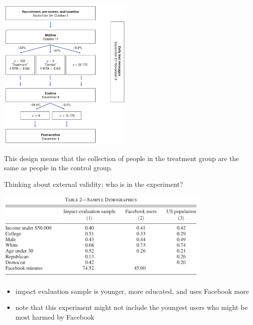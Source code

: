 \documentclass[aspectratio=169]{beamer}
\begin{document}
\begin{frame}

\begin{center}
\includegraphics[width=0.5\textwidth]{figures/allcott_welfare_2020_fig1}
\end{center}

This design means that the collection of people in the treatment group are the same as people in the control group.


\end{frame}
\begin{frame}

Thinking about external validity: who is in the experiment? \pause

\begin{center}
\includegraphics[width=0.8\textwidth]{figures/allcott_welfare_2020_tab2}
\end{center}

\begin{itemize}
\item impact evaluation sample is younger, more educated, and uses Facebook more
\item note that this experiment might not include the youngest users who might be most harmed by Facebook
\end{itemize}

\end{frame}
\end{document}
